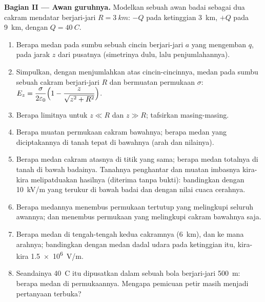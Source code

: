 \begin{problem}
\medskip
\noindent\textbf{Bagian II --- Awan guruhnya.}
Modelkan sebuah awan badai sebagai dua cakram mendatar berjari-jari $R = \qty{3}{km}$:
$-Q$ pada ketinggian \qty{3}{km}, $+Q$ pada \qty{9}{km}, dengan $Q = \qty{40}{C}$.
\begin{enumerate}[resume]
  \item Berapa medan pada sumbu sebuah cincin berjari-jari $a$ yang mengemban $q$, pada
        jarak $z$ dari pusatnya (simetrinya dulu, lalu penjumlahannya).
  \item Simpulkan, dengan menjumlahkan atas cincin-cincinnya, medan pada sumbu sebuah cakram
        berjari-jari $R$ dan bermuatan permukaan $\sigma$:
        $E_z = \dfrac{\sigma}{2\varepsilon_0}\Bigl(1 - \dfrac{z}{\sqrt{z^2 + R^2}}\Bigr)$.
  \item Berapa limitnya untuk $z \ll R$ dan $z \gg R$; tafsirkan masing-masing.
  \item Berapa muatan permukaan cakram bawahnya; berapa medan yang diciptakannya di tanah
        tepat di bawahnya (arah dan nilainya).
  \item Berapa medan cakram atasnya di titik yang sama; berapa medan totalnya di
        tanah di bawah badainya. Tanahnya penghantar dan muatan
        imbasnya kira-kira melipatduakan hasilnya (diterima tanpa bukti): bandingkan dengan
        \qty{10}{kV/m} yang terukur di bawah badai dan dengan nilai cuaca
        cerahnya.
  \item Berapa  medannya menembus permukaan tertutup yang melingkupi seluruh
        awannya; dan menembus permukaan yang melingkupi cakram bawahnya saja.
  \item Berapa medan di tengah-tengah kedua cakramnya (\qty{6}{km}), dan ke mana
        arahnya; bandingkan dengan medan dadal udara pada ketinggian
        itu, kira-kira \qty{1.5e6}{V/m}.
  \item Seandainya \qty{40}{C} itu dipusatkan dalam sebuah bola berjari-jari
        \qty{500}{m}: berapa medan di permukaannya. Mengapa pemicuan petir
        masih menjadi pertanyaan terbuka?
\end{enumerate}


\end{problem}
